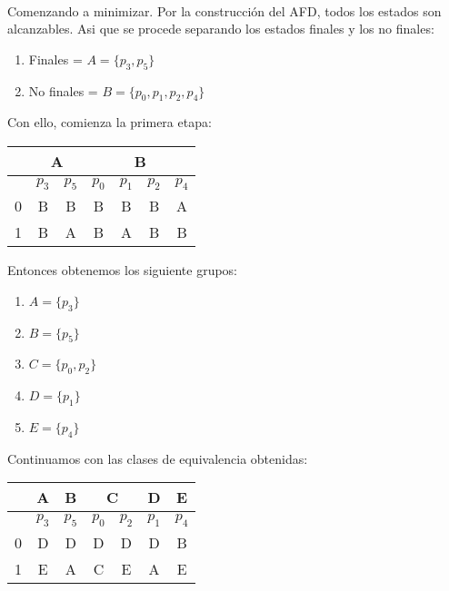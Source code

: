 \documentclass{article}
\begin{document}
\begin{enumerate}
\begin{table}[!h]
    \end{table}\\
        Comenzando a minimizar. Por la construcción del AFD, todos los estados son alcanzables. Asi que se procede separando los estados finales y los no finales:
        \begin{enumerate}
          \item Finales = $A = \{p_3, p_5\}$
          \item No finales = $B = \{p_0, p_1, p_2, p_4\}$
        \end{enumerate}

        Con ello, comienza la primera etapa:
        \begin{table}[!h]
          \centering
          \begin{tabular}{c | c | c | c | c | c | c}
            & \multicolumn{2}{c|}{A} & \multicolumn{4}{c}{B} \\    
            \hline
            & $p_3$ & $p_5$ & $p_0$ & $p_1$ & $p_2$ & $p_4$   \\
            \hline
            0 & B & B & B & B & B & A  \\
            1 & B & A & B & A & B & B
          \end{tabular}
        \end{table}
        \newpage
        Entonces obtenemos los siguiente grupos:
        \begin{enumerate}
          \item $A = \{p_3\}$
          \item $B = \{p_5\}$
          \item $C = \{p_0, p_2\}$
          \item $D = \{p_1\}$
          \item $E = \{p_4\}$
        \end{enumerate}

        Continuamos con las clases de equivalencia obtenidas:
        \begin{table}[!h]
          \centering
          \begin{tabular}{c | c | c | c | c | c | c}
            & \multicolumn{1}{c|}{A} & \multicolumn{1}{c|}{B} & \multicolumn{2}{c|}{C} & D & E \\    
            \hline
            & $p_3$ & $p_5$ & $p_0$ & $p_2$ & $p_1$ & $p_4$   \\
            \hline
            0 & D & D & D & D & D & B \\
            1 & E & A & C & E & A & E
          \end{tabular}
        \end{table}
        

\end{enumerate}
\end{document}

